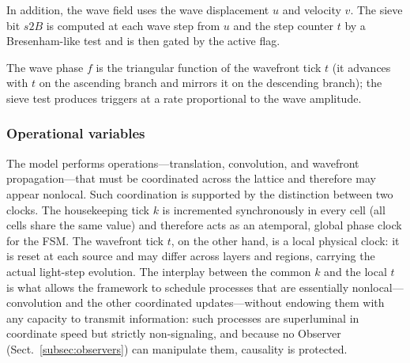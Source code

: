 \documentclass{ijuc}
\begin{document}
In addition, the wave field uses the wave displacement $u$ and velocity $v$. The sieve bit $s2B$ is computed at each wave step from $u$ and the step counter $t$ by a Bresenham-like test and is then gated by the active flag.

The wave phase $f$ is the triangular function of the wavefront tick $t$ (it advances with $t$ on the ascending branch and mirrors it on the descending branch); the sieve test produces triggers at a rate proportional to the wave amplitude.
 
\subsubsection{Operational variables}

The model performs operations---translation, convolution, and wavefront propagation---that must be coordinated across the lattice and therefore may appear nonlocal. Such coordination is supported by the distinction between two clocks. The housekeeping tick $k$ is incremented synchronously in every cell (all cells share the same value) and therefore acts as an atemporal, global phase clock for the FSM. The wavefront tick $t$, on the other hand, is a local physical clock: it is reset at each source and may differ across layers and regions, carrying the actual light-step evolution. The interplay between the common $k$ and the local $t$ is what allows the framework to schedule processes that are essentially nonlocal---convolution and the other coordinated updates---without endowing them with any capacity to transmit information: such processes are superluminal in coordinate speed but strictly non-signaling, and because no Observer (Sect.~\ref{subsec:observers}) can manipulate them, causality is protected.
\end{document}
